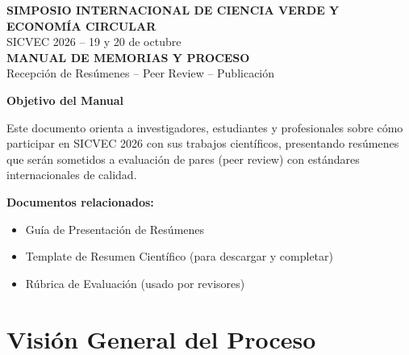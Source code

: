\documentclass[12pt,a4paper]{article}
\begin{document}

\thispagestyle{empty}

\begin{center}
{\Large\bfseries\color{verdeosc} SIMPOSIO INTERNACIONAL DE CIENCIA VERDE Y ECONOMÍA CIRCULAR}\\
{\normalsize\color{verdemid} SICVEC 2026 -- 19 y 20 de octubre}\\[1.5cm]
{\LARGE\bfseries MANUAL DE MEMORIAS Y PROCESO}\\
{\large\color{verdemid} Recepción de Resúmenes -- Peer Review -- Publicación}\\
\end{center}

\vspace{2cm}

\begin{tcolorbox}[enhanced, colback=verdeclaro, colframe=verdeosc, boxrule=2pt, left=15pt, right=15pt, top=15pt, bottom=15pt]

\noindent\textbf{\Large Objetivo del Manual}

Este documento orienta a investigadores, estudiantes y profesionales sobre cómo participar en SICVEC 2026 con sus trabajos científicos, presentando resúmenes que serán sometidos a evaluación de pares (peer review) con estándares internacionales de calidad.

\vspace{0.5cm}

\noindent\textbf{Documentos relacionados:}
\begin{itemize}[label={\color{verdemid}\checkmark}]
  \item Guía de Presentación de Resúmenes
  \item Template de Resumen Científico (para descargar y completar)
  \item Rúbrica de Evaluación (usado por revisores)
\end{itemize}

\end{tcolorbox}

\newpage
\tableofcontents
\newpage

\section{Visión General del Proceso}
\end{document}

